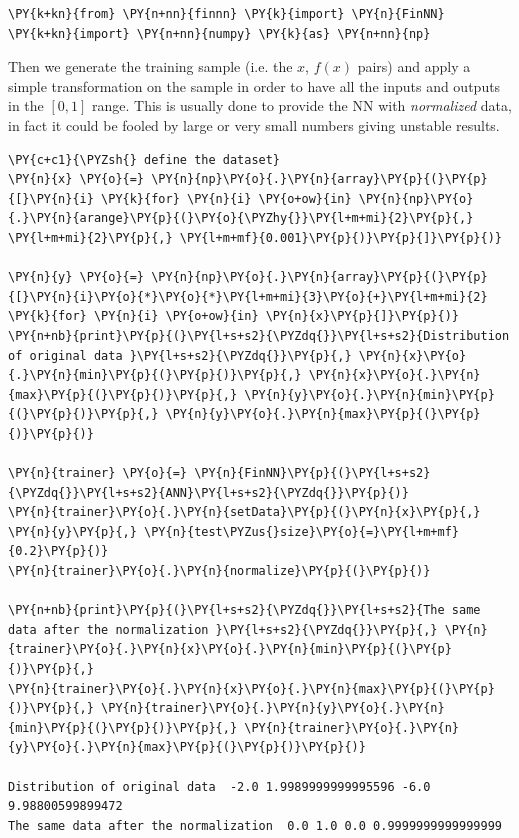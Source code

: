 \begin{codebox}[breakable, size=fbox, boxrule=1pt, pad at break*=1mm,colback=cellbackground, colframe=cellborder]
\begin{Verbatim}[commandchars=\\\{\}]
\PY{k+kn}{from} \PY{n+nn}{finnn} \PY{k}{import} \PY{n}{FinNN}
\PY{k+kn}{import} \PY{n+nn}{numpy} \PY{k}{as} \PY{n+nn}{np}
\end{Verbatim}
\end{codebox}

Then we generate the training sample (i.e. the \(x\), \(f(x)\) pairs)
and apply a simple transformation on the sample in order to have all the
inputs and outputs in the \([0, 1]\) range. This is usually done to
provide the NN with \emph{normalized} data, in fact it could be fooled
by large or very small numbers giving unstable results.

\begin{codebox}[breakable, size=fbox, boxrule=1pt, pad at break*=1mm,colback=cellbackground, colframe=cellborder]
\begin{Verbatim}[commandchars=\\\{\}]
\PY{c+c1}{\PYZsh{} define the dataset}
\PY{n}{x} \PY{o}{=} \PY{n}{np}\PY{o}{.}\PY{n}{array}\PY{p}{(}\PY{p}{[}\PY{n}{i} \PY{k}{for} \PY{n}{i} \PY{o+ow}{in} \PY{n}{np}\PY{o}{.}\PY{n}{arange}\PY{p}{(}\PY{o}{\PYZhy{}}\PY{l+m+mi}{2}\PY{p}{,} \PY{l+m+mi}{2}\PY{p}{,} \PY{l+m+mf}{0.001}\PY{p}{)}\PY{p}{]}\PY{p}{)}
	
\PY{n}{y} \PY{o}{=} \PY{n}{np}\PY{o}{.}\PY{n}{array}\PY{p}{(}\PY{p}{[}\PY{n}{i}\PY{o}{*}\PY{o}{*}\PY{l+m+mi}{3}\PY{o}{+}\PY{l+m+mi}{2} \PY{k}{for} \PY{n}{i} \PY{o+ow}{in} \PY{n}{x}\PY{p}{]}\PY{p}{)}
\PY{n+nb}{print}\PY{p}{(}\PY{l+s+s2}{\PYZdq{}}\PY{l+s+s2}{Distribution of original data }\PY{l+s+s2}{\PYZdq{}}\PY{p}{,} \PY{n}{x}\PY{o}{.}\PY{n}{min}\PY{p}{(}\PY{p}{)}\PY{p}{,} \PY{n}{x}\PY{o}{.}\PY{n}{max}\PY{p}{(}\PY{p}{)}\PY{p}{,} \PY{n}{y}\PY{o}{.}\PY{n}{min}\PY{p}{(}\PY{p}{)}\PY{p}{,} \PY{n}{y}\PY{o}{.}\PY{n}{max}\PY{p}{(}\PY{p}{)}\PY{p}{)}
	
\PY{n}{trainer} \PY{o}{=} \PY{n}{FinNN}\PY{p}{(}\PY{l+s+s2}{\PYZdq{}}\PY{l+s+s2}{ANN}\PY{l+s+s2}{\PYZdq{}}\PY{p}{)}
\PY{n}{trainer}\PY{o}{.}\PY{n}{setData}\PY{p}{(}\PY{n}{x}\PY{p}{,} \PY{n}{y}\PY{p}{,} \PY{n}{test\PYZus{}size}\PY{o}{=}\PY{l+m+mf}{0.2}\PY{p}{)}
\PY{n}{trainer}\PY{o}{.}\PY{n}{normalize}\PY{p}{(}\PY{p}{)}
	
\PY{n+nb}{print}\PY{p}{(}\PY{l+s+s2}{\PYZdq{}}\PY{l+s+s2}{The same data after the normalization }\PY{l+s+s2}{\PYZdq{}}\PY{p}{,} \PY{n}{trainer}\PY{o}{.}\PY{n}{x}\PY{o}{.}\PY{n}{min}\PY{p}{(}\PY{p}{)}\PY{p}{,} 
\PY{n}{trainer}\PY{o}{.}\PY{n}{x}\PY{o}{.}\PY{n}{max}\PY{p}{(}\PY{p}{)}\PY{p}{,} \PY{n}{trainer}\PY{o}{.}\PY{n}{y}\PY{o}{.}\PY{n}{min}\PY{p}{(}\PY{p}{)}\PY{p}{,} \PY{n}{trainer}\PY{o}{.}\PY{n}{y}\PY{o}{.}\PY{n}{max}\PY{p}{(}\PY{p}{)}\PY{p}{)}

Distribution of original data  -2.0 1.9989999999995596 -6.0 9.98800599899472
The same data after the normalization  0.0 1.0 0.0 0.9999999999999999
\end{Verbatim}
\end{codebox}

